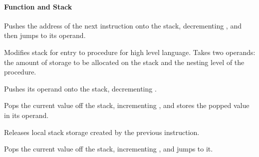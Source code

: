 \paragraph{Function and Stack}
\begin{description}[align=right, font=\keywordstyle]
  \item[call] Pushes the address of the next instruction onto the stack,
    decrementing , and then jumps to its operand.
  \item[enter] Modifies stack for entry to procedure
    for high level language. Takes two operands: the amount of storage to be allocated on the stack and the nesting level of the procedure.
  \item[push] Pushes its operand onto the stack,
    decrementing .
  \item[pop] Pops the current value off the stack,
    incrementing , and stores the popped value in its operand.
  \item[leave] Releases local stack storage created by the previous
     instruction.
  \item[ret] Pops the current value off the stack,
    incrementing , and jumps to it.
\end{description}

